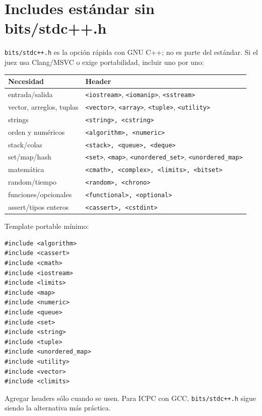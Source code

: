 \section{Includes est\'andar sin bits/stdc++.h}

\texttt{bits/stdc++.h} es la opci\'on r\'apida con GNU C++; no es parte del
est\'andar. Si el juez usa Clang/MSVC o exige portabilidad, incluir uno por uno:

\begin{center}
\begin{tabular}{@{}p{}p{}@{}}
Necesidad & Header \\
\hline
entrada/salida & \texttt{<iostream>}, \texttt{<iomanip>}, \texttt{<sstream>} \\
vector, arreglos, tuplas & \texttt{<vector>}, \texttt{<array>}, \texttt{<tuple>}, \texttt{<utility>} \\
strings & \texttt{<string>, <cstring>} \\
orden y num\'ericos & \texttt{<algorithm>, <numeric>} \\
stack/colas & \texttt{<stack>, <queue>, <deque>} \\
set/map/hash & \texttt{<set>}, \texttt{<map>}, \texttt{<unordered\_set>}, \texttt{<unordered\_map>} \\
matem\'atica & \texttt{<cmath>, <complex>, <limits>, <bitset>} \\
random/tiempo & \texttt{<random>, <chrono>} \\
funciones/opcionales & \texttt{<functional>, <optional>} \\
assert/tipos enteros & \texttt{<cassert>, <cstdint>} \\
\end{tabular}
\end{center}

Template portable m\'inimo:

\begin{lstlisting}[style=cpp]
#include <algorithm>
#include <cassert>
#include <cmath>
#include <iostream>
#include <limits>
#include <map>
#include <numeric>
#include <queue>
#include <set>
#include <string>
#include <tuple>
#include <unordered_map>
#include <utility>
#include <vector>
#include <climits>
\end{lstlisting}

Agregar headers s\'olo cuando se usen. Para ICPC con GCC,
\texttt{bits/stdc++.h} sigue siendo la alternativa m\'as pr\'actica.
